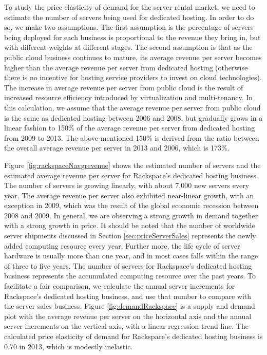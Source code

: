 \documentclass[10pt,journal,cspaper,compsoc]{IEEEtran}
\begin{document}
To study the price elasticity of demand for the server rental market, we need to estimate the number of servers being used for dedicated hosting. In order to do so, we make two assumptions. The first assumption is the percentage of servers being deployed for each business is proportional to the revenue they bring in, but with different weights at different stages. The second assumption is that as the public cloud business continues to mature, its average revenue per server becomes higher than the average revenue per server from dedicated hosting (otherwise there is no incentive for hosting service providers to invest on cloud technologies). The increase in average revenue per server from public cloud is the result of increased resource efficiency introduced by virtualization and multi-tenancy. In this calculation, we assume that the average revenue per server from public cloud is the same as dedicated hosting between 2006 and 2008, but gradually grows in a linear fashion to 150\% of the average revenue per server from dedicated hosting from 2009 to 2013. The above-mentioned 150\% is derived from the ratio between the overall average revenue per server in 2013 and 2006, which is 173\%.

Figure \ref{fig:rackspaceNavgrevenue} shows the estimated number of servers and the estimated average revenue per server for Rackspace's dedicated hosting business. The number of servers is growing linearly, with about 7,000 new servers every year. The average revenue per server also exhibited near-linear growth, with an exception in 2009, which was the result of the global economic recession between 2008 and 2009. In general, we are observing a strong growth in demand together with a strong growth in price. It should be noted that the number of worldwide server shipments discussed in Section \ref{sec:priceServerSales} represents the newly added computing resource every year. Further more, the life cycle of server hardware is usually more than one year, and in most cases falls within the range of three to five years. The number of servers for Rackspace's dedicated hosting business represents the accumulated computing resource over the past years. To facilitate a fair comparison, we calculate the annual server increments for Rackspace's dedicated hosting business, and use that number to compare with the server sales business. Figure \ref{fig:demandRackspace} is a supply and demand plot with the average revenue per server on the horizontal axis and the annual server increments on the vertical axis, with a linear regression trend line. The calculated price elasticity of demand for Rackspace's dedicated hosting business is 0.70 in 2013, which is modestly inelastic.
\end{document}
